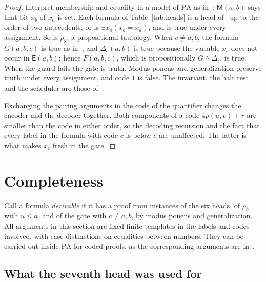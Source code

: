 \documentclass[11pt,letterpaper]{article}
\newcommand{\PA}{\mathrm{PA}}
\newcommand{\Mc}{\mathsf{M}}
\newcommand{\Ec}{\mathsf{E}}
\begin{document}
\begin{proof}
Interpret membership and equality in a model of $\PA$ as
in~\cite[\S4.2]{pa209}: $\Mc(a,b)$ says that bit $x_b$ of $x_a$ is
set. Each formula of Table~\ref{tab:heads} is a head of~\cite{pa209}
up to the order of two antecedents, or is $\exists x_a(x_b=x_a)$, and
is true under every assignment. So is $\rho_8$, a propositional
tautology. When $c\ne a,b$, the formula $G(a,b,c)$ is true as
in~\cite{pa209}, and $\Delta_c(a,b)$ is true because the variable
$x_c$ does not occur in $\Ec(a,b)$; hence $F(a,b,c)$, which is
propositionally $G\wedge\Delta_c$, is true. When the guard fails the
gate is truth. Modus ponens and generalization preserve truth under
every assignment, and code $1$ is false. The invariant, the halt test
and the scheduler are those of~\cite[\S4.2]{pa209}.

Exchanging the pairing arguments in the code of the quantifier changes
the encoder and the decoder together. Both components of a code
$4p(u,v)+r$ are smaller than the code in either order, so the decoding
recursion and the fact that every label in the formula with code $c$
is below $c$ are unaffected. The latter is what makes $x_c$ fresh in
the gate.
\end{proof}

\section{Completeness}\label{sec:complete}

Call a formula \emph{derivable} if it has a proof from instances of
the six heads, of $\rho_8$ with $u\le a$, and of the gate with
$c\ne a,b$, by modus ponens and generalization. All arguments in this
section are fixed finite templates in the labels and codes involved,
with case distinctions on equalities between numbers. They can be
carried out inside $\PA$ for coded proofs, as the corresponding
arguments are in~\cite[\S6.1]{pa209}.

\subsection{What the seventh head was used for}
\end{document}
